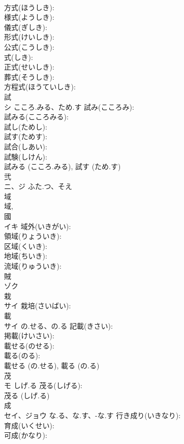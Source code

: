 \documentclass[8pt]{extreport}
\begin{document}
\begin{CJK}{UTF8}{min}
\\	方式(ほうしき): 
\\	様式(ようしき): 
\\	儀式(ぎしき): 
\\	形式(けいしき): 
\\	公式(こうしき): 
\\	式(しき): 
\\	正式(せいしき): 
\\	葬式(そうしき): 
\\	方程式(ほうていしき): 
\\	試			
\\	シ	こころ.みる、ため.す	試み(こころみ): 
\\	試みる(こころみる): 
\\	試し(ためし): 
\\	試す(ためす): 
\\	試合(しあい): 
\\	試験(しけん): 
\\	試みる (こころ.みる), 試す (ため.す)
\\	弐			
\\	ニ、ジ	ふた.つ、そえ		
\\	域			
\\	域, 
\\	國 
\\	イキ		域外(いきがい): 
\\	領域(りょういき): 
\\	区域(くいき): 
\\	地域(ちいき): 
\\	流域(りゅういき): 
\\	賊			
\\	ゾク			
\\	栽			
\\	サイ		栽培(さいばい): 
\\	載			
\\	サイ	の.せる、の.る	記載(きさい): 
\\	掲載(けいさい): 
\\	載せる(のせる): 
\\	載る(のる): 
\\	載せる (の.せる), 載る (の.る)
\\	茂		
\\	モ	しげ.る	茂る(しげる): 
\\	茂る (しげ.る)
\\	成			
\\	セイ、ジョウ	な.る、な.す、-な.す	行き成り(いきなり): 
\\	育成(いくせい): 
\\	可成(かなり): 

\end{CJK}
\end{document}
